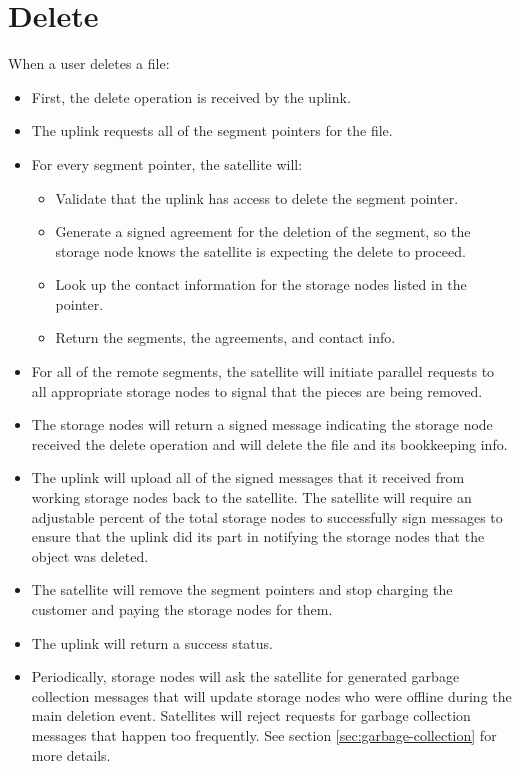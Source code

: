 \documentclass[11pt,fleqn,openany]{book}
\begin{document}
\section{Delete}

When a user deletes a file:

\begin{itemize}
\item First, the delete operation is received by the uplink.
\item The uplink requests all of the segment pointers for the file.
\item For every segment pointer, the satellite will:
  \begin{itemize}
  \item Validate that the uplink has access to delete the segment pointer.
  \item Generate a signed agreement for the deletion of the segment, so the
    storage node knows the satellite is expecting the delete to proceed.
  \item Look up the contact information for the storage nodes listed in the
  pointer.
  \item Return the segments, the agreements, and contact info.
  \end{itemize}
\item For all of the remote segments, the satellite will
  initiate parallel requests to all appropriate storage nodes to signal that the
  pieces are being removed.
\item The storage nodes will return a signed message indicating the storage node
received
the
  delete operation and will delete the file and its bookkeeping info.
\item The uplink will upload all of the signed messages that it received from
  working storage nodes back to the satellite. The satellite will require an
  adjustable percent of the total storage nodes to successfully sign messages
  to ensure that the uplink did its part in notifying the storage nodes that the
  object was deleted.
\item The satellite will remove the segment pointers and stop charging the
  customer and paying the storage nodes for them.
\item The uplink will return a success status.
\item Periodically, storage nodes will ask the satellite for generated garbage
  collection messages that will update storage nodes who were offline during the
  main deletion event.
  Satellites will reject requests for garbage collection messages that
  happen too frequently. See section \ref{sec:garbage-collection} for more
  details.
\end{itemize}
\end{document}
